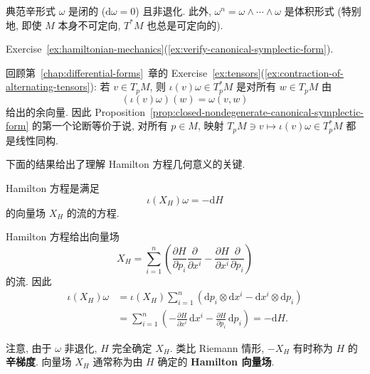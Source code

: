\begin{RiemannProposition}\label{prop:closed-nondegenerate-canonical-symplectic-form}
典范辛形式 $\omega$ 是闭的 ($\mathrm{d}\omega=0$) 且非退化. 此外, $\omega^n=\omega\wedge\cdots\wedge\omega$ 是体积形式 (特别地, 即使 $M$ 本身不可定向, $T^*M$ 也总是可定向的).
\end{RiemannProposition}

\begin{RiemannProof}
Exercise~\ref{ex:hamiltonian-mechanics}(\ref{ex:verify-canonical-symplectic-form}).
\end{RiemannProof}

回顾第~\ref{chap:differential-forms}~章的 Exercise~\ref{ex:tensors}(\ref{ex:contraction-of-alternating-tensors}): 若 $v\in T_pM$, 则 $\iota(v)\omega\in T_p^*M$ 是对所有 $w\in T_pM$ 由
\[
  (\iota(v)\omega)(w)=\omega(v,w)
\]
给出的余向量. 因此 Proposition~\ref{prop:closed-nondegenerate-canonical-symplectic-form} 的第一个论断等价于说, 对所有 $p\in M$, 映射 $T_pM\ni v\mapsto\iota(v)\omega\in T_p^*M$ 都是线性同构.

下面的结果给出了理解 Hamilton 方程几何意义的关键.

\begin{RiemannProposition}\label{prop:hamilton-equations-as-symplectic-duality}
Hamilton 方程是满足
\[
  \iota(X_H)\omega=-\mathrm{d}H
\]
的向量场 $X_H$ 的流的方程.
\end{RiemannProposition}

\begin{RiemannProof}
Hamilton 方程给出向量场
\[
  X_H=\sum_{i=1}^n\left(
    \frac{\partial H}{\partial p_i}\frac{\partial}{\partial x^i}
   -\frac{\partial H}{\partial x^i}\frac{\partial}{\partial p_i}\right)
\]
的流. 因此
\begin{align*}
  \iota(X_H)\omega
  &=\iota(X_H)\sum_{i=1}^n(\mathrm{d}p_i\otimes\mathrm{d}x^i
                        -\mathrm{d}x^i\otimes\mathrm{d}p_i)\\
  &=\sum_{i=1}^n\left(-\frac{\partial H}{\partial x^i}\,\mathrm{d}x^i
                    -\frac{\partial H}{\partial p_i}\,\mathrm{d}p_i\right)
    =-\mathrm{d}H.
\end{align*}
\end{RiemannProof}

\begin{RiemannRemark}\label{rem:symplectic-gradient-of-hamiltonian}
注意, 由于 $\omega$ 非退化, $H$ 完全确定 $X_H$. 类比 Riemann 情形, $-X_H$ 有时称为 $H$ 的\textbf{辛梯度}. 向量场 $X_H$ 通常称为由 $H$ 确定的 \textbf{Hamilton 向量场}.
\end{RiemannRemark}

